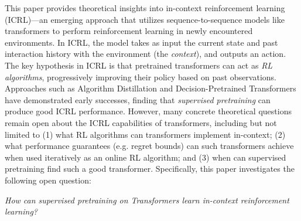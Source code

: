 \documentclass[10pt]{article}
\newcommand{\authnote}[2]{{\scriptsize $\ll$\textsf{#1 notes: #2}$\gg$}}
\newcommand{\authnote}[2]{}
\newcommand{\yub}[1]{{\color{red}\authnote{Yu}{#1}}}
\begin{document}


This paper provides theoretical insights into in-context reinforcement learning (ICRL)---an emerging approach that utilizes sequence-to-sequence models like transformers to perform reinforcement learning in newly encountered environments. In ICRL, the model takes as input the current state and past interaction history with the environment (the \emph{context}), and outputs an action. The key hypothesis in ICRL is that pretrained transformers can act as \emph{RL algorithms}, progressively improving their policy based on past observations. Approaches such as Algorithm Distillation \citep{laskin2022context} and Decision-Pretrained Transformers \citep{lee2023supervised} have demonstrated early successes, finding that \emph{supervised pretraining} can produce good ICRL performance. However, many concrete theoretical questions remain open about the ICRL capabilities of transformers, including but not limited to (1) what RL algorithms can transformers implement in-context; (2) what performance guarantees (e.g. regret bounds) can such transformers achieve when used iteratively as an online RL algorithm; and (3) when can supervised pretraining find such a good transformer. Specifically, this paper investigates the following open question:
\begin{center}
\emph{How can supervised pretraining on Transformers learn in-context reinforcement learning?}
\end{center}
\end{document}
